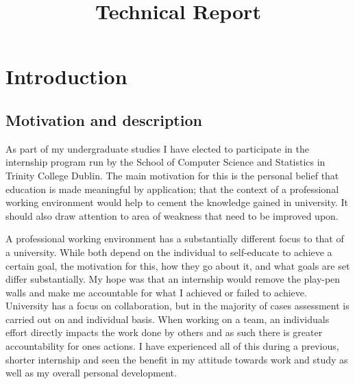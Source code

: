 \documentclass[a4paper, 11pt, titlepage]{article}
\title{Technical Report}
\begin{document}
\onehalfspacing
\maketitle

\tableofcontents

\newpage
 
\section{Introduction} 
 
\subsection{Motivation and description} 
 
As part of my undergraduate studies I have elected to participate in the internship program run by the School of Computer Science and Statistics in Trinity College Dublin. The main motivation for this is the personal belief that education is made meaningful by application; that the context of a professional working environment would help to cement the knowledge gained in university. It should also draw attention to area of weakness that need to be improved upon.

A professional working environment has a substantially different focus to that of a university. While both depend on the individual to self-educate to achieve a certain goal, the motivation for this, how they go about it, and what goals are set differ substantially. My hope was that an internship would remove the play-pen walls and make me accountable for what I achieved or failed to achieve. University has a focus on collaboration, but in the majority of cases assessment is carried out on and individual basis. When working on a team, an individuals effort directly impacts the work done by others and as such there is greater accountability for ones actions. I have experienced all of this during a previous, shorter internship and seen the benefit in my attitude towards work and study as well as my overall personal development. 
 
\end{document}
